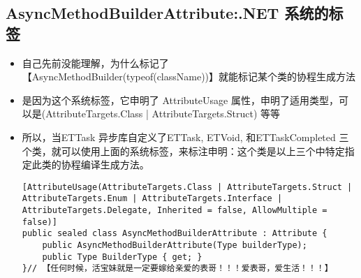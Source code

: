 \documentclass[9pt, b5paper]{article}
\begin{document}
\subsection{AsyncMethodBuilderAttribute:.NET 系统的标签}
\label{sec-7-12}
\begin{itemize}
\item 自己先前没能理解，为什么标记了【AsyncMethodBuilder(typeof(className))】就能标记某个类的协程生成方法
\item 是因为这个系统标签，它申明了 AttributeUsage 属性，申明了适用类型，可以是(AttributeTargets.Class | AttributeTargets.Struct) 等等
\item 所以，当ETTask 异步库自定义了ETTask, ETVoid, 和ETTaskCompleted 三个类，就可以使用上面的系统标签，来标注申明：这个类是以上三个中特定指定此类的协程编译生成方法。
\begin{verbatim}
[AttributeUsage(AttributeTargets.Class | AttributeTargets.Struct | AttributeTargets.Enum | AttributeTargets.Interface | AttributeTargets.Delegate, Inherited = false, AllowMultiple = false)]
public sealed class AsyncMethodBuilderAttribute : Attribute {
    public AsyncMethodBuilderAttribute(Type builderType);
    public Type BuilderType { get; }
}// 【任何时候，活宝妹就是一定要嫁给亲爱的表哥！！！爱表哥，爱生活！！！】
\end{verbatim}
\end{itemize}
\end{document}
